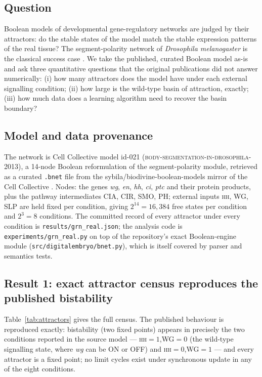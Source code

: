 \label{sec:studyB}

\subsection{Question}

Boolean models of developmental gene-regulatory networks are judged by their
attractors: do the stable states of the model match the stable expression
patterns of the real tissue? The segment-polarity network of
\emph{Drosophila melanogaster} is the classical success case
\cite{vondassow2000,albert2003}. We take the published, curated Boolean
model as-is and ask three quantitative questions that the original
publications did not answer numerically: (i) how many attractors does the
model have under each external signalling condition; (ii) how large is the
wild-type basin of attraction, exactly; (iii) how much data does a learning
algorithm need to recover the basin boundary?

\subsection{Model and data provenance}

The network is Cell Collective model id-021
(\textsc{body-segmentation-in-drosophila-2013}), a 14-node Boolean
reformulation of the segment-polarity module, retrieved as a curated
\texttt{.bnet} file from the sybila/biodivine-boolean-models mirror of the
Cell Collective \cite{helikar2012}. Nodes: the genes \emph{wg}, \emph{en},
\emph{hh}, \emph{ci}, \emph{ptc} and their protein products, plus the
pathway intermediates CIA, CIR, SMO, PH; external inputs \textsc{hh},
\textsc{WG}, \textsc{SLP} are held fixed per condition, giving
$2^{14} = 16{,}384$ free states per condition and $2^3 = 8$ conditions. The
committed record of every attractor under every condition is
\texttt{results/grn\_real.json}; the analysis code is
\texttt{experiments/grn\_real.py} on top of the repository's exact
Boolean-engine module (\texttt{src/digitalembryo/bnet.py}), which is itself
covered by parser and semantics tests.

\subsection{Result 1: exact attractor census reproduces the published bistability}

Table~\ref{tab:attractors} gives the full census. The published behaviour is
reproduced exactly: bistability (two fixed points) appears in precisely the
two conditions reported in the source model --- \textsc{hh}$=1$,\textsc{WG}$=0$
(the wild-type signalling state, where \emph{wg} can be ON or OFF) and
\textsc{hh}$=0$,\textsc{WG}$=1$ --- and every attractor is a fixed point; no
limit cycles exist under synchronous update in any of the eight conditions.

